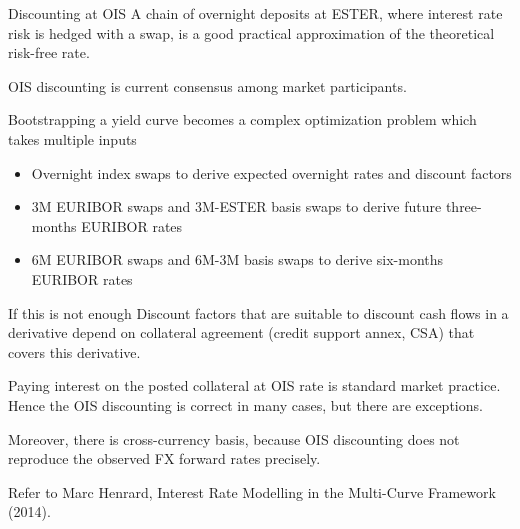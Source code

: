 \documentclass{beamer}
\begin{document}
\begin{frame}{Discounting at OIS}
\justify
A chain of overnight deposits at ESTER, where interest rate risk is hedged with a swap, is a good practical approximation
of the theoretical risk-free rate.

\justify
OIS discounting is current consensus among market participants.

\justify
Bootstrapping a yield curve becomes a complex optimization problem which takes multiple inputs
\begin{itemize}
\item Overnight index swaps to derive expected overnight rates and discount factors
\item 3M EURIBOR swaps and 3M-ESTER basis swaps to derive future three-months EURIBOR rates
\item 6M EURIBOR swaps and 6M-3M basis swaps to derive six-months EURIBOR  rates
\end{itemize}
\end{frame}



\begin{frame}{If this is not enough}
\justify
Discount factors that are suitable to discount cash flows in a derivative depend on collateral agreement (credit support annex, CSA) that covers this derivative.

\justify
Paying interest on the posted collateral at OIS rate is standard market practice. Hence the OIS discounting is correct in many cases, but there are exceptions.

\justify
Moreover, there is cross-currency basis, because OIS discounting does not reproduce the observed FX forward rates precisely.

\justify
Refer to Marc Henrard, Interest Rate Modelling in the Multi-Curve Framework (2014).
\end{frame}
\end{document}
